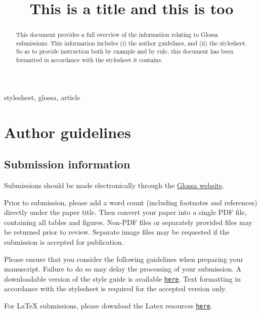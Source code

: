 \documentclass[cm,linguex]{glossa}
\title[A subtitle goes on another line]{This is a title and this is too}
\author[Paul \& Vanden Wyngaerd]{
    \spauthor{Waltraud Paul\\
  \institute{CNRS, CRLAO}\\
  \small{105, Bd. Raspail, 75005 Paris waltraud.paul@ehess.fr}
  }%
  \AND  \spauthor{Guido Vanden Wyngaerd\\
  \institute{KU Leuven}\\
  \small{}
  }%
  }
\begin{document}
\sffamily
\maketitle

\begin{abstract}
This document provides a full overview of the information relating to
Glossa submissions. This information includes (i) the author guidelines,
and (ii) the stylesheet. So as to provide instruction both by example
and by rule, this document has been formatted in accordance with the
stylesheet it contains.
\end{abstract}

\begin{keywords}
  stylesheet, glossa, article
\end{keywords}

\rmfamily

\hypertarget{author-guidelines}{%
\section{Author guidelines}\label{author-guidelines}}

\hypertarget{submission-information}{%
\subsection{Submission information}\label{submission-information}}

Submissions should be made electronically through the
\href{http://glossa.ubiquitypress.com}{Glossa website}.

Prior to submission, please add a word count (including footnotes and
references) directly under the paper title. Then convert your paper into
a single PDF file, containing all tables and figures. Non-PDF files or
separately provided files may be returned prior to review. Separate
image files may be requested if the submission is accepted for
publication.

Please ensure that you consider the following guidelines when preparing
your manuscript. Failure to do so may delay the processing of your
submission. A downloadable version of the style guide is available
\href{https://github.com/guidovw/Glossalatex/blob/master/glossa-template.pdf}{\texttt{here}}.
Text formatting in accordance with the stylesheet is required for the
accepted version only.

For LaTeX submissions, please download the Latex resources
\href{https://github.com/guidovw/Glossalatex}{\texttt{here}}.
\end{document}
